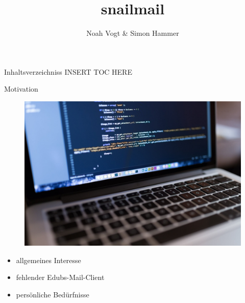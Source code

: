 \documentclass[aspectratio=169]{beamer}
\title{snailmail}
\author{Noah Vogt \& Simon Hammer}
\institute{Gymnasium Kirschgarten}
\newlength\myheight
\newlength\mydepth
\newcommand*\inlinegraphics[1]{
    \settototalheight\myheight{Xygp}
    \settodepth\mydepth{Xygp}
    \raisebox{-\mydepth}{\texttt{[image: \#1]}}%
}
\begin{document}
\maketitle

\begin{frame}{Inhaltsverzeichniss}
INSERT TOC HERE
\end{frame}

\begin{frame}{Motivation}
\begin{varwidth}{.5\textwidth}
        \begin{figure}
            \centering
            \includegraphics[width=.9\textwidth]{media/macbook.jpg}
        \end{figure}
    \end{varwidth}
    \hfill
    \begin{varwidth}{.5\textwidth}
        \begin{itemize}
            \item allgemeines Interesse
            \item fehlender Edubs-Mail-Client
            \item persönliche Bedürfnisse
        \end{itemize}
    \end{varwidth} 
\end{frame}
\end{document}
